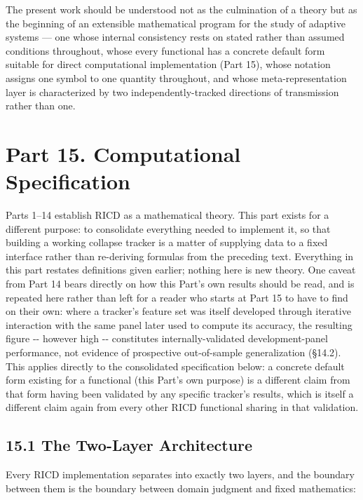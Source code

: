 \documentclass[
]{article}
\begin{document}
The present work should be understood not as the culmination of a theory
but as the beginning of an extensible mathematical program for the study
of adaptive systems --- one whose internal consistency rests on stated
rather than assumed conditions throughout, whose every functional has a
concrete default form suitable for direct computational implementation
(Part 15), whose notation assigns one symbol to one quantity throughout,
and whose meta-representation layer is characterized by two
independently-tracked directions of transmission rather than one.

\hypertarget{part-15.-computational-specification}{%
\section{Part 15. Computational
Specification}\label{part-15.-computational-specification}}

Parts 1--14 establish RICD as a mathematical theory. This part exists
for a different purpose: to consolidate everything needed to implement
it, so that building a working collapse tracker is a matter of supplying
data to a fixed interface rather than re-deriving formulas from the
preceding text. Everything in this part restates definitions given
earlier; nothing here is new theory. One caveat from Part 14 bears
directly on how this Part's own results should be read, and is repeated
here rather than left for a reader who starts at Part 15 to have to find
on their own: where a tracker's feature set was itself developed through
iterative interaction with the same panel later used to compute its
accuracy, the resulting figure -\/- however high -\/- constitutes
internally-validated development-panel performance, not evidence of
prospective out-of-sample generalization (§14.2). This applies directly
to the consolidated specification below: a concrete default form
existing for a functional (this Part's own purpose) is a different claim
from that form having been validated by any specific tracker's results,
which is itself a different claim again from every other RICD functional
sharing in that validation.

\hypertarget{the-two-layer-architecture}{%
\subsection{15.1 The Two-Layer
Architecture}\label{the-two-layer-architecture}}

Every RICD implementation separates into exactly two layers, and the
boundary between them is the boundary between domain judgment and fixed
mathematics:
\end{document}
